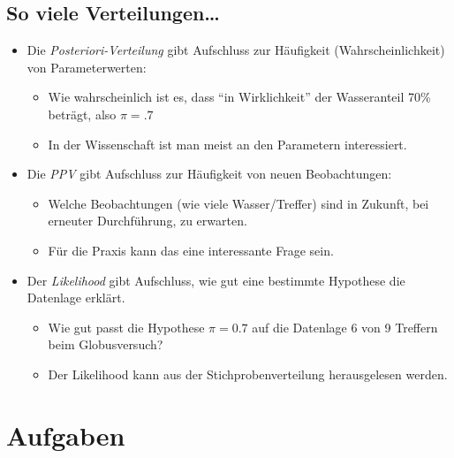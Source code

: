 \documentclass[
  a4paper,
  DIV=11]{scrreprt}
\providecommand{\tightlist}{%
  \setlength{\itemsep}{0pt}\setlength{\parskip}{0pt}}\usepackage{longtable,booktabs,array}
\theoremstyle{definition}
\theoremstyle{remark}
\begin{document}
\hypertarget{so-viele-verteilungen}{%
\subsection{So viele Verteilungen\ldots{}}\label{so-viele-verteilungen}}

\begin{itemize}
\tightlist
\item
  Die \emph{Posteriori-Verteilung} gibt Aufschluss zur Häufigkeit
  (Wahrscheinlichkeit) von Parameterwerten:

  \begin{itemize}
  \tightlist
  \item
    Wie wahrscheinlich ist es, dass ``in Wirklichkeit'' der Wasseranteil
    70\% beträgt, also \(\pi=.7\)
  \item
    In der Wissenschaft ist man meist an den Parametern interessiert.
  \end{itemize}
\item
  Die \emph{PPV} gibt Aufschluss zur Häufigkeit von neuen Beobachtungen:

  \begin{itemize}
  \tightlist
  \item
    Welche Beobachtungen (wie viele Wasser/Treffer) sind in Zukunft, bei
    erneuter Durchführung, zu erwarten.
  \item
    Für die Praxis kann das eine interessante Frage sein.
  \end{itemize}
\item
  Der \emph{Likelihood} gibt Aufschluss, wie gut eine bestimmte
  Hypothese die Datenlage erklärt.

  \begin{itemize}
  \tightlist
  \item
    Wie gut passt die Hypothese \(\pi=0.7\) auf die Datenlage 6 von 9
    Treffern beim Globusversuch?
  \item
    Der Likelihood kann aus der Stichprobenverteilung herausgelesen
    werden.
  \end{itemize}
\end{itemize}

\hypertarget{aufgaben-5}{%
\section{Aufgaben}\label{aufgaben-5}}
\end{document}
